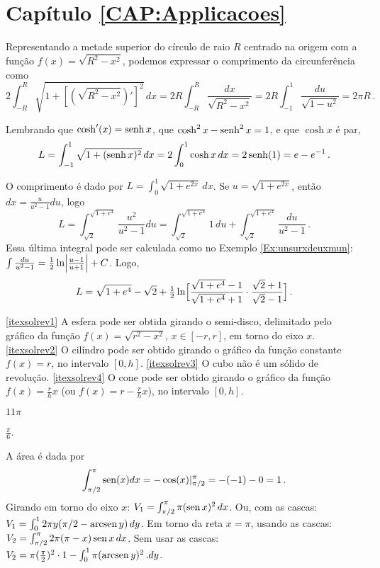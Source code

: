 \protect \section *{Capítulo \ref {CAP:Applicacoes}}
\begin{Solution}{10.1}
 Representando a metade superior do círculo de raio $R$ centrado na origem com a função $f(x)=\sqrt{R^2-x^2}$, podemos expressar o
comprimento da circunferência como
$$
2\int_{-R}^R\sqrt{1+[(\sqrt{R^2-x^2})']^2}\,dx=2R\int_{-R}^R\frac{dx}{\sqrt{R^2-x^2}}=2R\int_{-1}^1\frac{du}{\sqrt{1-u^2}}=2\pi R\,.
$$
\end{Solution}
\begin{Solution}{10.2}
Lembrando que $\cosh'(x)=\operatorname{senh} x$, que $\cosh^2 x-\operatorname{senh}^2x=1$, e que $\cosh x$ é par,
\begin{align*}
 L=\int_{-1}^1\sqrt{1+(\operatorname{senh} x)^2}\,dx=2\int_{0}^1\cosh x\,dx=2\operatorname{senh} (1)=e-e^{-1}\,.
\end{align*}
\end{Solution}
\begin{Solution}{10.3}
O comprimento é dado por $L=\int_0^1\sqrt{1+e^{2x}}\,dx$.
Se $u=\sqrt{1+e^{2x}}$, então $dx=\frac{u}{u^2-1}du$, logo
$$L=\int_{\sqrt{2}}^{\sqrt{1+e^4}}\frac{u^2}{u^2-1}du
=\int_{\sqrt{2}}^{\sqrt{1+e^4}}1\,du+\int_{\sqrt{2}}^{\sqrt{1+e^4}}\frac{du}{
u^2-1}\,.
$$
Essa última integral pode ser calculada como no Exemplo \ref{Ex:unsurxdeuxmun}:
$\int\frac{du}{
u^2-1}=\tfrac{1}{2}\ln\Bigl|\frac{u-1}{u+1}\Bigr|+C$. Logo,
$$
L=\sqrt{1+e^4}-\sqrt{2}+\tfrac12\ln\Bigl[\frac{\sqrt{1+e^4}-1}{\sqrt{1+e^4}
+1}\cdot\frac{\sqrt{2}+1}{\sqrt{2}-1}\Bigr]\,.
$$
\end{Solution}
\begin{Solution}{10.4}
\eqref{itexsolrev1} A esfera pode ser obtida girando o semi-disco,
delimitado pelo gráfico da função
$f(x)=\sqrt{r^2-x^2}$, $x\in [-r,r]$, em torno do eixo $x$.
\eqref{itexsolrev2} O cilíndro pode ser obtido girando o gráfico da função
constante $f(x)=r$, no intervalo $[0,h]$.
\eqref{itexsolrev3} O cubo não é um sólido de revolução.
\eqref{itexsolrev4} O cone pode ser obtido girando o gráfico da função
$f(x)=\frac{r}{h}x$ (ou $f(x)=r-\frac{r}{h}x$), no intervalo $[0,h]$.
\end{Solution}
\begin{Solution}{10.5}
 $11\pi$
 
\end{Solution}
\begin{Solution}{10.6}
$\tfrac{\pi}{6}$.
\end{Solution}
\begin{Solution}{10.8}
A área é dada por
$$\int_{\pi/2}^\pi\operatorname{sen} (x)dx=-\cos (x)|^{\pi}_{\pi/2}=-(-1)-0=1\,.$$
Girando em torno do eixo $x$:
$V_1=\int_{\pi/2}^{\pi}\pi(\operatorname{sen} x)^2\,dx$.
Ou, com as cascas: $V_1=\int_0^12\pi y (\pi/2-\operatorname{arcsen} y)\,dy$.
Em torno da reta $x=\pi$, usando as cascas:
$V_2=\int_{\pi/2}^\pi2\pi(\pi-x)\operatorname{sen} x\,dx$.
Sem usar as cascas:
$V_2=\pi(\tfrac{\pi}{2})^2\cdot 1-\int_0^1\pi (\operatorname{arcsen} y)^2\,.dy$.
\end{Solution}
